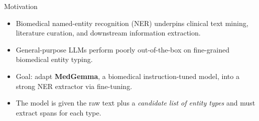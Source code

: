 \begin{frame}{Motivation}
  \begin{itemize}
    \item Biomedical named-entity recognition (NER) underpins clinical text mining, literature curation, and downstream information extraction.
    \item General-purpose LLMs perform poorly out-of-the-box on fine-grained biomedical entity typing.
    \item Goal: adapt \textbf{MedGemma}, a biomedical instruction-tuned model, into a strong NER extractor via fine-tuning.
    \item The model is given the raw text plus a \emph{candidate list of entity types} and must extract spans for each type.
  \end{itemize}
\end{frame}
